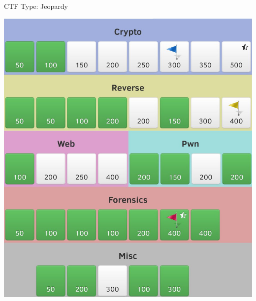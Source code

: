 \begin{frame}
  {CTF Type: Jeopardy}

  \begin{center}
    \includegraphics[height=0.8\textheight]{./images/sharifctf-challenges.jpg}
  \end{center}
\end{frame}

